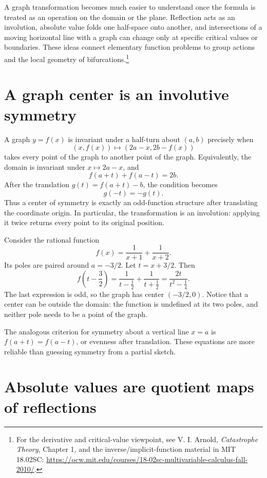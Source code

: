 
A graph transformation becomes much easier to understand once the formula is treated as an operation on the domain or the plane. Reflection acts as an involution, absolute value folds one half-space onto another, and intersections of a moving horizontal line with a graph can change only at specific critical values or boundaries. These ideas connect elementary function problems to group actions and the local geometry of bifurcations.\footnote{For the derivative and critical-value viewpoint, see V. I. Arnold, \emph{Catastrophe Theory}, Chapter 1, and the inverse/implicit-function material in MIT 18.02SC: \url{https://ocw.mit.edu/courses/18-02sc-multivariable-calculus-fall-2010/}.}

\section{A graph center is an involutive symmetry}

A graph \(y=f(x)\) is invariant under a half-turn about \((a,b)\) precisely when
\[
 (x,f(x))\longmapsto(2a-x,2b-f(x))
\]
takes every point of the graph to another point of the graph. Equivalently, the domain is invariant under \(x\mapsto2a-x\), and
\[
 \boxed{f(a+t)+f(a-t)=2b.}
\]
After the translation \(g(t)=f(a+t)-b\), the condition becomes
\[
 g(-t)=-g(t).
\]
Thus a center of symmetry is exactly an odd-function structure after translating the coordinate origin. In particular, the transformation is an involution: applying it twice returns every point to its original position.

Consider the rational function
\[
 f(x)=\frac1{x+1}+\frac1{x+2}.
\]
Its poles are paired around \(a=-3/2\). Let \(t=x+3/2\). Then
\[
 f\left(t-\frac32\right)
 =\frac1{t-\frac12}+\frac1{t+\frac12}
 =\frac{2t}{t^2-\frac14}.
\]
The last expression is odd, so the graph has center \((-3/2,0)\). Notice that a center can be outside the domain: the function is undefined at its two poles, and neither pole needs to be a point of the graph.

The analogous criterion for symmetry about a vertical line \(x=a\) is \(f(a+t)=f(a-t)\), or evenness after translation. These equations are more reliable than guessing symmetry from a partial sketch.

\section{Absolute values are quotient maps of reflections}

